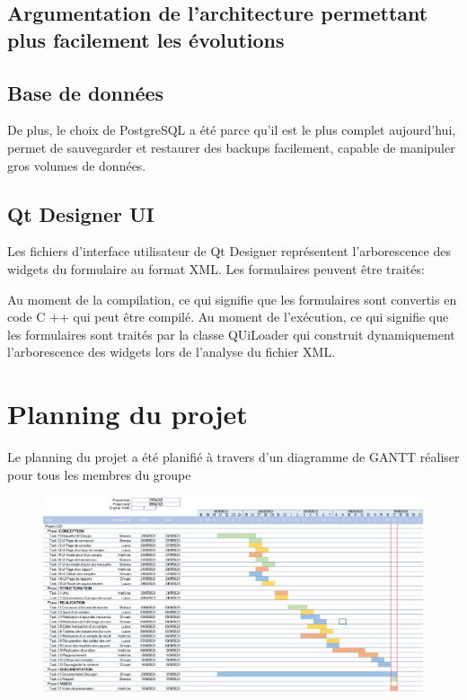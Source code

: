 \documentclass[10pt,a4paper,openany]{report}
\begin{document}
	
	\subsection{Argumentation de l'architecture permettant plus facilement les évolutions}
	
	\subsection{Base de données}	
	 De plus, le choix de PostgreSQL a été parce qu'il est le plus complet aujourd'hui, permet de sauvegarder et restaurer des backups facilement, capable de manipuler gros volumes de données.
	
	\subsection{Qt Designer UI}
	Les fichiers d'interface utilisateur de Qt Designer représentent l'arborescence des widgets du formulaire au format XML. Les formulaires peuvent être traités:
	
	Au moment de la compilation, ce qui signifie que les formulaires sont convertis en code C ++ qui peut être compilé.
	Au moment de l'exécution, ce qui signifie que les formulaires sont traités par la classe QUiLoader qui construit dynamiquement l'arborescence des widgets lors de l'analyse du fichier XML.

	\section{Planning du projet}
	
	Le planning du projet a été planifié à travers d'un diagramme de GANTT réaliser pour tous les membres du groupe
	
	\begin{figure}[H]
		\begin{center}
			\includegraphics[width = 1\textwidth]{GANTT.PNG}
		\end{center} 
	\end{figure}
	
\end{document}
